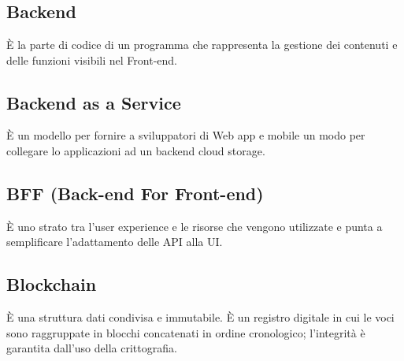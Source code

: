 \section{}
\subsection*{Backend} È la parte di codice di un programma che rappresenta la gestione dei contenuti e delle funzioni visibili nel Front-end.

\subsection*{Backend as a Service} È un modello per fornire a sviluppatori di Web app e mobile un modo per collegare lo applicazioni ad un backend cloud storage.

\subsection*{BFF (Back-end For Front-end)} È uno strato tra l'user experience e le risorse che vengono utilizzate e punta a semplificare l'adattamento delle API alla UI.

\subsection*{Blockchain} È una struttura dati condivisa e immutabile. È un registro digitale in cui le voci sono raggruppate in blocchi concatenati in ordine cronologico; l'integrità è garantita dall'uso della crittografia.